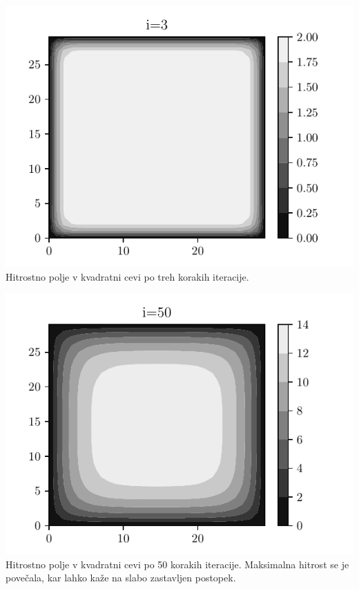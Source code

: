 \begin{center}
    \begin{minipage}{0.45\textwidth}
        \centering
    \includegraphics[width=\textwidth]{../old/../old/0-kvadratna_i3.pdf}
    {Hitrostno polje v kvadratni cevi po treh korakih iteracije.}
    \end{minipage}\hfill
    \begin{minipage}{0.45\textwidth}
        \centering
        \includegraphics[width=1\textwidth]{../old/0-kvadratna_i50.pdf}
    {Hitrostno polje v kvadratni cevi po 50 korakih iteracije. Maksimalna hitrost se je povečala, kar lahko kaže na slabo zastavljen postopek.}
    \end{minipage}



\end{center}
